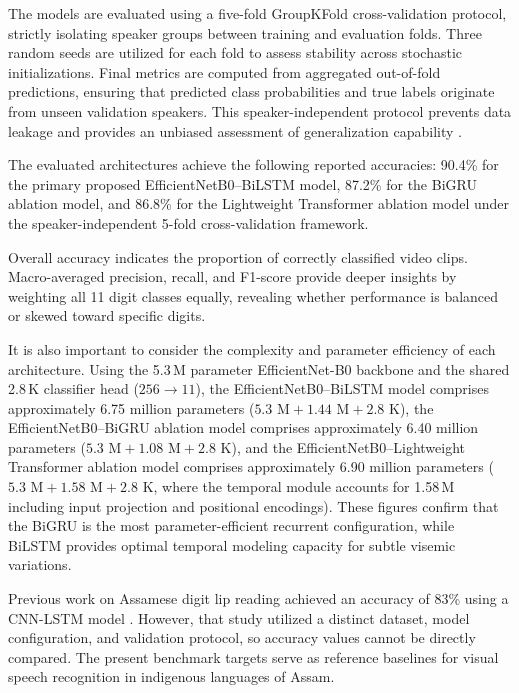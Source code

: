 \documentclass[journal]{IEEEtran}
\begin{document}
The models are evaluated using a five-fold GroupKFold cross-validation protocol, strictly isolating speaker groups between training and evaluation folds. Three random seeds are utilized for each fold to assess stability across stochastic initializations. Final metrics are computed from aggregated out-of-fold predictions, ensuring that predicted class probabilities and true labels originate from unseen validation speakers. This speaker-independent protocol prevents data leakage and provides an unbiased assessment of generalization capability \cite{nemani2023speakerindependent,sheng2024visual}.

The evaluated architectures achieve the following reported accuracies: 90.4\% for the primary proposed EfficientNetB0--BiLSTM model, 87.2\% for the BiGRU ablation model, and 86.8\% for the Lightweight Transformer ablation model under the speaker-independent 5-fold cross-validation framework.

Overall accuracy indicates the proportion of correctly classified video clips. Macro-averaged precision, recall, and F1-score provide deeper insights by weighting all 11 digit classes equally, revealing whether performance is balanced or skewed toward specific digits.

It is also important to consider the complexity and parameter efficiency of each architecture. Using the 5.3\,M parameter EfficientNet-B0 backbone and the shared 2.8\,K classifier head ($256 \to 11$), the EfficientNetB0--BiLSTM model comprises approximately 6.75 million parameters ($5.3\text{ M} + 1.44\text{ M} + 2.8\text{ K}$), the EfficientNetB0--BiGRU ablation model comprises approximately 6.40 million parameters ($5.3\text{ M} + 1.08\text{ M} + 2.8\text{ K}$), and the EfficientNetB0--Lightweight Transformer ablation model comprises approximately 6.90 million parameters ($5.3\text{ M} + 1.58\text{ M} + 2.8\text{ K}$, where the temporal module accounts for 1.58\,M including input projection and positional encodings). These figures confirm that the BiGRU is the most parameter-efficient recurrent configuration, while BiLSTM provides optimal temporal modeling capacity for subtle visemic variations.

Previous work on Assamese digit lip reading achieved an accuracy of 83\% using a CNN-LSTM model \cite{prasad2025analysis}. However, that study utilized a distinct dataset, model configuration, and validation protocol, so accuracy values cannot be directly compared. The present benchmark targets serve as reference baselines for visual speech recognition in indigenous languages of Assam.
\end{document}

